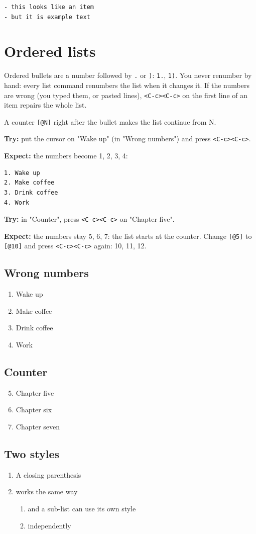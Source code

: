 \begin{verbatim}
- this looks like an item
- but it is example text
\end{verbatim}
\section{Ordered lists}
\label{sec:org9627784}
Ordered bullets are a number followed by \texttt{.} or \texttt{)}: \texttt{1.}, \texttt{1)}. You never
renumber by hand: every list command renumbers the list when it changes it.
If the numbers are wrong (you typed them, or pasted lines), \texttt{<C-c><C-c>} on
the first line of an item repairs the whole list.

A counter \texttt{[@N]} right after the bullet makes the list continue from N.

\textbf{Try:} put the cursor on "Wake up" (in "Wrong numbers") and press
\texttt{<C-c><C-c>}.

\textbf{Expect:} the numbers become 1, 2, 3, 4:
\begin{verbatim}
1. Wake up
2. Make coffee
3. Drink coffee
4. Work
\end{verbatim}

\textbf{Try:} in "Counter", press \texttt{<C-c><C-c>} on "Chapter five".

\textbf{Expect:} the numbers stay 5, 6, 7: the list starts at the counter.
Change \texttt{[@5]} to \texttt{[@10]} and press \texttt{<C-c><C-c>} again: 10, 11, 12.
\subsection{Wrong numbers}
\label{sec:org3030266}
\begin{enumerate}
\item Wake up
\item Make coffee
\item Drink coffee
\item Work
\end{enumerate}
\subsection{Counter}
\label{sec:org10c0f82}
\begin{enumerate}
\setcounter{enumi}{4}
\item Chapter five
\item Chapter six
\item Chapter seven
\end{enumerate}
\subsection{Two styles}
\label{sec:org8463113}
\begin{enumerate}
\item A closing parenthesis
\item works the same way
\begin{enumerate}
\item and a sub-list can use its own style
\item independently
\end{enumerate}
\end{enumerate}
